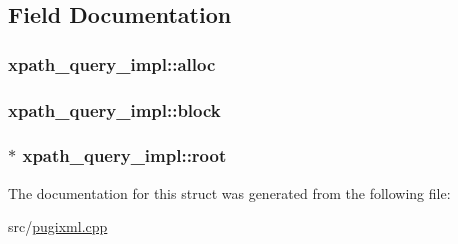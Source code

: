 \subsection{Field Documentation}
\hypertarget{structxpath__query__impl_ae568b8642d48e729f2ccc2a50467c847}{
\subsubsection[{alloc}]{ {\bf xpath\_\-query\_\-impl::alloc}}}
\label{structxpath__query__impl_ae568b8642d48e729f2ccc2a50467c847}
\hypertarget{structxpath__query__impl_a3a8af3ceed6a504567656ec6d1b62641}{
\subsubsection[{block}]{ {\bf xpath\_\-query\_\-impl::block}}}
\label{structxpath__query__impl_a3a8af3ceed6a504567656ec6d1b62641}
\hypertarget{structxpath__query__impl_ad25499e0c8391005e3a1a60633d631fe}{
\subsubsection[{root}]{$\ast$ {\bf xpath\_\-query\_\-impl::root}}}
\label{structxpath__query__impl_ad25499e0c8391005e3a1a60633d631fe}


The documentation for this struct was generated from the following file:\begin{DoxyCompactItemize}
\item 
src/\hyperlink{pugixml_8cpp}{pugixml.cpp}\end{DoxyCompactItemize}
